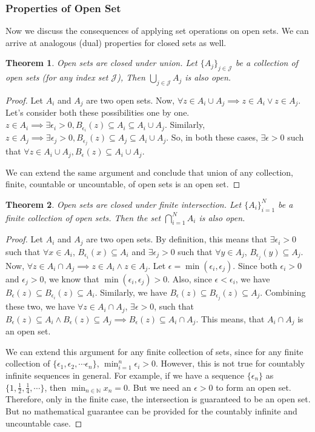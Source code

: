 \documentclass{report}
\theoremstyle{plain}
\newtheorem{theorem}{Theorem}[chapter] %
\theoremstyle{definition}
\begin{document}
\subsubsection{Properties of Open Set}
\noindent Now we discuss the consequences of applying set operations on open sets. We can arrive at analogous (dual) properties for closed sets as well.
\begin{theorem}
Open sets are closed under union. Let $\{A_j\}_{j\in\mathcal{J}}$ be a collection of open sets (for any index set $\mathcal{J}$), Then $\bigcup_{j\in\mathcal{J}} A_j$ is also open.
\end{theorem}
\begin{proof}
Let $A_i$ and $A_j$ are two open sets. Now, $\forall z\in A_i\cup A_j\implies z\in A_i\vee z\in A_j$. Let's consider both these possibilities one by one. $z\in A_i\implies \exists \epsilon_i>0, B_{\epsilon_i}(z)\subseteq A_i\subseteq A_i\cup A_j$. Similarly, $z\in A_j\implies \exists \epsilon_j>0, B_{\epsilon_j}(z)\subseteq A_j\subseteq A_i\cup A_j$. So, in both these cases, $\exists\epsilon>0$ such that $\forall z\in A_i\cup A_j, B_\epsilon(z)\subseteq A_i\cup A_j$.

We can extend the same argument and conclude that union of any collection, finite, countable or uncountable, of open sets is an open set.
\end{proof}
\begin{theorem}
Open sets are closed under finite intersection. Let $\{A_i\}_{i=1}^N$ be a finite collection of open sets. Then the set $\bigcap_{i=1}^N A_i$ is also open.
\end{theorem}
\begin{proof}
Let $A_i$ and $A_j$ are two open sets. By definition, this means that $\exists \epsilon_i>0$ such that $\forall x\in A_i$, $B_{\epsilon_i}(x)\subseteq A_i$ and $\exists \epsilon_j>0$ such that $\forall y\in A_j$, $B_{\epsilon_j}(y)\subseteq A_j$. Now, $\forall z\in A_i\cap A_j\implies z\in A_i\wedge z\in A_j$. Let $\epsilon=\min(\epsilon_i, \epsilon_j)$. Since both $\epsilon_i>0$ and $\epsilon_j>0$, we know that $\min(\epsilon_i, \epsilon_j)>0$. Also, since $\epsilon<\epsilon_i$, we have $B_\epsilon(z)\subseteq B_{\epsilon_i}(z)\subseteq A_i$. Similarly, we have $B_\epsilon(z)\subseteq B_{\epsilon_j}(z)\subseteq A_j$. Combining these two, we have $\forall z\in A_i\cap A_j$, $\exists\epsilon>0$, such that $B_\epsilon(z)\subseteq A_i\wedge B_\epsilon(z)\subseteq A_j\implies B_\epsilon(z)\subseteq A_i\cap A_j$. This means, that $A_i\cap A_j$ is an open set.

We can extend this argument for any finite collection of sets, since for any finite collection of $\{\epsilon_1, \epsilon_2, \cdots \epsilon_n\}$, $\min_{i=1}^n \epsilon_i > 0$. However, this is not true for countably infinite sequences in general. For example, if we have a sequence $\{\epsilon_n\}$ as $\{1,\frac{1}{2},\frac{1}{4},\cdots\}$, then $\min_{n\in\mathbb{N}} x_n = 0$. But we need an $\epsilon>0$ to form an open set. Therefore, only in the finite case, the intersection is guaranteed to be an open set. But no mathematical guarantee can be provided for the countably infinite and uncountable case.
\end{proof}
\end{document}
